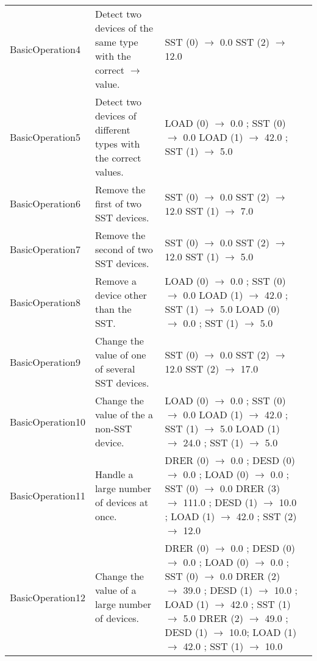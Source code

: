 \documentclass{article}
\begin{document}
\begin{center}
\begin{footnotesize}
\begin{longtable}{|p{3cm}|p{4cm}|p{10cm}|c|}
    BasicOperation4 & Detect two devices of the same type with the correct $\rightarrow$ value. & SST (0) $\rightarrow$ 0.0 \newline SST (2) $\rightarrow$ 12.0 & \\
    BasicOperation5 & Detect two devices of different types with the correct values. & LOAD (0) $\rightarrow$ 0.0 ; SST (0) $\rightarrow$ 0.0 \newline LOAD (1) $\rightarrow$ 42.0 ; SST (1) $\rightarrow$ 5.0 & \\
    BasicOperation6 & Remove the first of two SST devices. & SST (0) $\rightarrow$ 0.0 \newline SST (2) $\rightarrow$ 12.0 \newline SST (1) $\rightarrow$ 7.0 & \\
    BasicOperation7 & Remove the second of two SST devices. & SST (0) $\rightarrow$ 0.0 \newline SST (2) $\rightarrow$ 12.0 \newline SST (1) $\rightarrow$ 5.0 & \\
    BasicOperation8 & Remove a device other than the SST. & LOAD (0) $\rightarrow$ 0.0 ; SST (0) $\rightarrow$ 0.0 \newline LOAD (1) $\rightarrow$ 42.0 ; SST (1) $\rightarrow$ 5.0 \newline LOAD (0) $\rightarrow$ 0.0 ; SST (1) $\rightarrow$ 5.0 & \\
    BasicOperation9 & Change the value of one of several SST devices. & SST (0) $\rightarrow$ 0.0 \newline SST (2) $\rightarrow$ 12.0 \newline SST (2) $\rightarrow$ 17.0 & \\
    BasicOperation10 & Change the value of the a non-SST device. & LOAD (0) $\rightarrow$ 0.0 ; SST (0) $\rightarrow$ 0.0 \newline LOAD (1) $\rightarrow$ 42.0 ; SST (1) $\rightarrow$ 5.0 \newline LOAD (1) $\rightarrow$ 24.0 ; SST (1) $\rightarrow$ 5.0 & \\
    BasicOperation11 & Handle a large number of devices at once. & DRER (0) $\rightarrow$ 0.0 ; DESD (0) $\rightarrow$ 0.0 ; LOAD (0) $\rightarrow$ 0.0 ; SST (0) $\rightarrow$ 0.0 \newline DRER (3) $\rightarrow$ 111.0 ; DESD (1) $\rightarrow$ 10.0 ; LOAD (1) $\rightarrow$ 42.0 ; SST (2) $\rightarrow$ 12.0 & \\
    BasicOperation12 & Change the value of a large number of devices. & DRER (0) $\rightarrow$ 0.0 ; DESD (0) $\rightarrow$ 0.0 ; LOAD (0) $\rightarrow$ 0.0 ; SST (0) $\rightarrow$ 0.0 \newline DRER (2) $\rightarrow$ 39.0 ; DESD (1) $\rightarrow$ 10.0 ; LOAD (1) $\rightarrow$ 42.0 ; SST (1) $\rightarrow$ 5.0 \newline DRER (2) $\rightarrow$ 49.0 ; DESD (1) $\rightarrow$ 10.0; LOAD (1) $\rightarrow$ 42.0 ; SST (1) $\rightarrow$ 10.0 & \\

\end{longtable}
\end{footnotesize}
\end{center}
\end{document}
